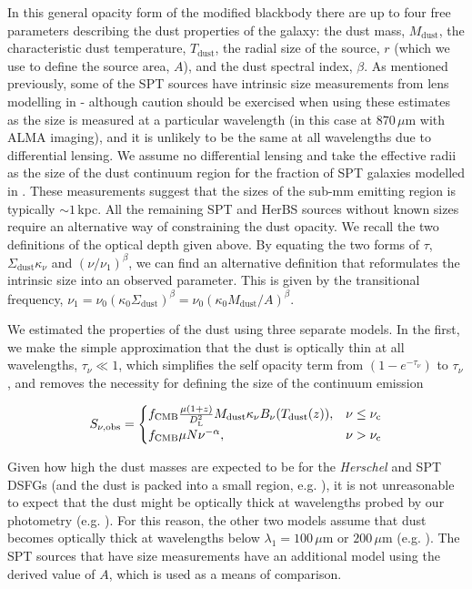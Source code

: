 In this general opacity form of the modified blackbody there are up to four free parameters describing the dust properties of the galaxy: the dust mass, $M_{\textrm{dust}}$, the characteristic dust temperature, $T_{\textrm{dust}}$, the radial size of the source, $r$ (which we use to define the source area, $A$), and the dust spectral index, $\beta$. As mentioned previously, some of the SPT sources have intrinsic size measurements from lens modelling in \citealt{Spilker_2016} - although caution should be exercised when using these estimates as the size is measured at a particular wavelength (in this case at $870\,\mu$m with ALMA imaging), and it is unlikely to be the same at all wavelengths due to differential lensing. We assume no differential lensing and take the effective radii as the size of the dust continuum region for the fraction of SPT galaxies modelled in \citealt{Spilker_2016}. These measurements suggest that the sizes of the sub-mm emitting region is typically $\sim 1\,$kpc. All the remaining SPT and HerBS sources without known sizes require an alternative way of constraining the dust opacity. We recall the two definitions of the optical depth given above. By equating the two forms of $\tau$, $\Sigma_{\textrm{dust}}\kappa_\nu$  and $(\nu/\nu_1)^\beta$, we can find an alternative definition that reformulates the intrinsic size into an observed parameter. This is given by the transitional frequency, $\nu_1 = \nu_0 (\kappa_0\Sigma_{\textrm{dust}})^\beta = \nu_0 (\kappa_0M_{\textrm{dust}}/A)^\beta$.

We estimated the properties of the dust using three separate models. In the first, we make the simple approximation that the dust is optically thin at all wavelengths, $\tau_\nu \ll 1$, which simplifies the self opacity term from $(1 - e^{-\tau_\nu})$ to $\tau_\nu$, and removes the necessity for defining the size of the continuum emission

\begin{equation}
	S_{\nu, \textrm{obs}} =  
	\begin{cases}
		f_{\textrm{CMB}}\frac{\mu (1+z)}{D_{\rm L}^2} M_{\textrm{dust}} \kappa_\nu B_\nu(T_{\textrm{dust}}(z)), & \nu \le \nu_{\rm c} \\
		f_{\textrm{CMB}}\mu N \nu^{-\alpha}, & \nu > \nu_{\rm c} \\
	\end{cases}
    \label{eq:modified_blackbody_optically_thin}
\end{equation}

Given how high the dust masses are expected to be for the \textit{Herschel} and SPT DSFGs (and the dust is packed into a small region, e.g. \citealt{Ikarashi_2017}), it is not unreasonable to expect that the dust might be optically thick at wavelengths probed by our photometry (e.g. \citealt{Conley_2011, Casey_2019, Cortzen_2020}). For this reason, the other two models assume that dust becomes optically thick at wavelengths below $\lambda_1 = 100\,\mu$m or $200\,\mu$m (e.g. \citealt{Blain_2003, Draine_2006, Conley_2011, Rangwala_2011, Greve_2012, Casey_2014a, Spilker_2016, Casey_2019, Cooper_2022, Drew_2022}). The SPT sources that have size measurements have an additional model using the derived value of $A$, which is used as a means of comparison.

